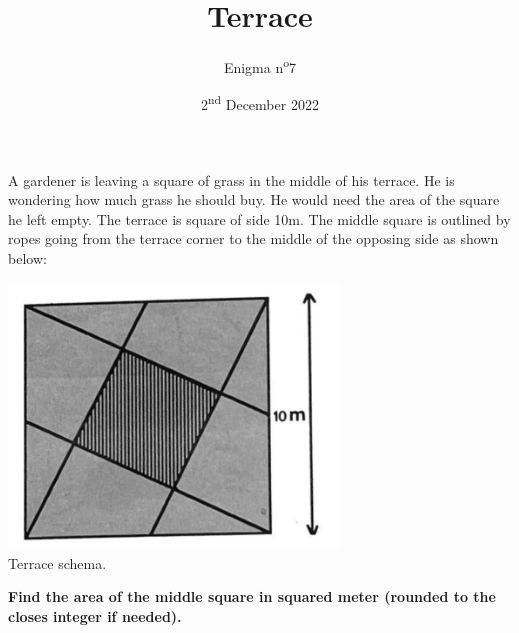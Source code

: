 \documentclass[a4paper, top=10mm]{article}
\title{\textbf{\huge{Terrace}}}
\author{Enigma n\textsuperscript{o}7}
\date{2\textsuperscript{nd} December 2022}
\begin{document}
	\maketitle
	
	A gardener is leaving a square of grass in the middle of his terrace.
	He is wondering how much grass he should buy.
	He would need the area of the square he left empty.
	The terrace is square of side 10m.
	The middle square is outlined by ropes going from the terrace corner to the middle of the opposing side as shown below:
	
	\vspace{0.5cm}
	
	\begin{center}
		\includegraphics[height=200pt]{07pavement.png}\\
		Terrace schema.
	\end{center}
	
	\vspace{3cm}
	
	\textbf{Find the area of the middle square in squared meter (rounded to the closes integer if needed).}
	
\end{document}

